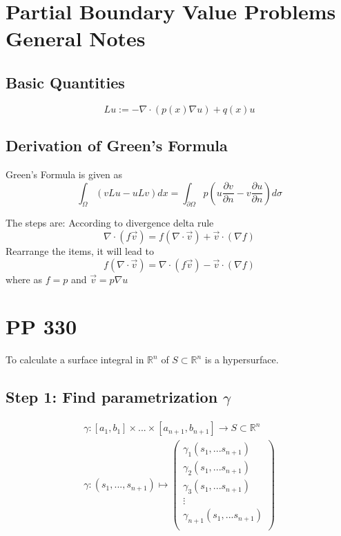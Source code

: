 \documentclass{article}
\numberwithin{equation}{section}
\newcommand{\<}{\langle}
\begin{document}
\section{Partial Boundary Value Problems General Notes}
\subsection{Basic Quantities}
\begin{tcolorbox}[colback=blue!10!white]
\begin{equation}
	L u :=-\nabla\cdot (p(x) \nabla u)+q(x) u
\end{equation}
\end{tcolorbox}
\subsection{Derivation of Green's Formula}
\begin{tcolorbox}[colback=green!10!white]
Green's Formula is given as
\begin{equation}
	\int_{\Omega}(v L u-u L v) d x = \int_{\partial \Omega} p\left(u \frac{\partial v}{\partial n}-v \frac{\partial u}{\partial n}\right) d \sigma
\end{equation}
\end{tcolorbox}
The steps are: According to divergence delta rule
\begin{equation}
	\nabla \cdot(f \vec{v})=f(\nabla \cdot \vec{v})+\vec{v} \cdot(\nabla f)
\end{equation}
Rearrange the items, it will lead to
\begin{equation}
	f(\nabla \cdot \vec{v})=\nabla \cdot(f \vec{v})-\vec{v} \cdot(\nabla f)
\end{equation}
where as $f = p$ and $\vec v = p \nabla u$
\section{PP 330}
To calculate a surface integral in $\mathbb{R}^n$ of $S\subset \mathbb{R}^n$ is a hypersurface.
\subsection{Step 1: Find parametrization $\gamma$}
\begin{align*}
	\gamma :[a_1,b_1]\times ... \times [a_{n+1},b_{n+1}] \rightarrow S \subset \mathbb{R}^n \\
	\gamma: (s_1,...,s_{n+1}) \mapsto \begin{pmatrix}
	\gamma_1(s_1,...s_{n+1})\\
	\gamma_2(s_1,...s_{n+1})\\
	\gamma_3(s_1,...s_{n+1})\\
	\vdots \\
	\gamma_{n+1}(s_1,...s_{n+1})\\
	\end{pmatrix} 
\end{align*}
\end{document}
